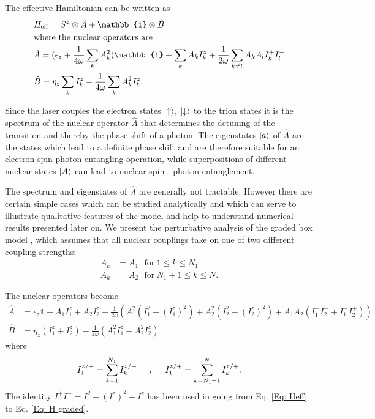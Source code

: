 \documentclass[aps, pra, amsfonts, a4paper, showpacs]{revtex4-1}
\begin{document}
The effective Hamiltonian can be written as 
\begin{equation}\begin{split}
&\heff =S^z \otimes \hat{A} + \mathbb{1} \otimes \hat{B} \\
&\mathrm{where\ the\ nuclear\ operators\ are}\\
&\hat{A}=(\epsilon_z + \frac{1}{4\omega}\sum_k A_k^2)\mathbb{1} + \sum_k A_k I_k^z + \frac{1}{2\omega}\sum_{k \neq l} A_k A_l I_k^+ I_l^- \\
&\hat{B} = \eta_z \sum_k I_k^z - \frac{1}{4\omega} \sum_k A_k^2 I_k^z.
\end{split} \label{Eq. AB} \end{equation}

Since the laser couples the electron states $\ket{\uparrow}$, $\ket{\downarrow}$ to the trion states it is the spectrum of the nuclear operator $\hat{A}$ that determines the detuning of the transition and thereby the phase shift of a photon. The eigenstates $\ket{a}$ of $\hat{A}$ are the states which lead to a definite phase shift and are therefore suitable for an electron spin-photon entangling operation, while superpositions of different nuclear states $\ket{A}$ can lead to nuclear spin - photon entanglement.

The spectrum and eigenstates of $\hat{A}$ are generally not tractable. However there are certain simple cases which can be studied analytically and which can serve to illustrate qualitative features of the model and help to understand numerical results presented later on. We present the perturbative analysis of the graded box model \cite{petrov_coupled_2009}, which assumes that all nuclear couplings take on one of two different coupling strengths:
\begin{equation}\begin{split}
A_k &= A_1\ \ \ \mathrm{for}\ 1 \leq k \leq N_1\\ 
A_k &= A_2\ \ \ \mathrm{for}\ N_1+1 \leq k \leq N.
\end{split} \label{Eq: A graded} \end{equation}

The nuclear operators become
\begin{equation}\begin{split}
\hat{A}&=\epsilon_z \mathbb{1} + A_1 I_1^z + A_2 I_2^z + \frac{1}{2\omega}\left(A_1^2 (I_1^2 - (I_1^z)^2) + A_2^2 (I_2^2 - (I_2^z)^2 ) + A_1 A_2 (I_1^+ I_2^- + I_1^- I_2^+)\right) \\
\hat{B}&=\eta_z(I_1^z + I_2^z) -  \frac{1}{4\omega}(A_1^2 I_1^z + A_2^2 I_2^z)
\end{split} \label{Eq: H graded}
\end{equation}
where
\[
I^{z/+}_1 = \sum_{k=1}^{N_1} I_k^{z/+} \hspace{0.5cm} ,\hspace{0.5cm} I^{z/+}_1 = \sum_{k=N_1+1}^{N} I_k^{z/+}.
\]
The identity $I^+I^-=I^2 - (I^z)^2 + I^z$ has been used in going from Eq. \ref{Eq: Heff} to Eq. \ref{Eq: H graded}.\linebreak
\end{document}
